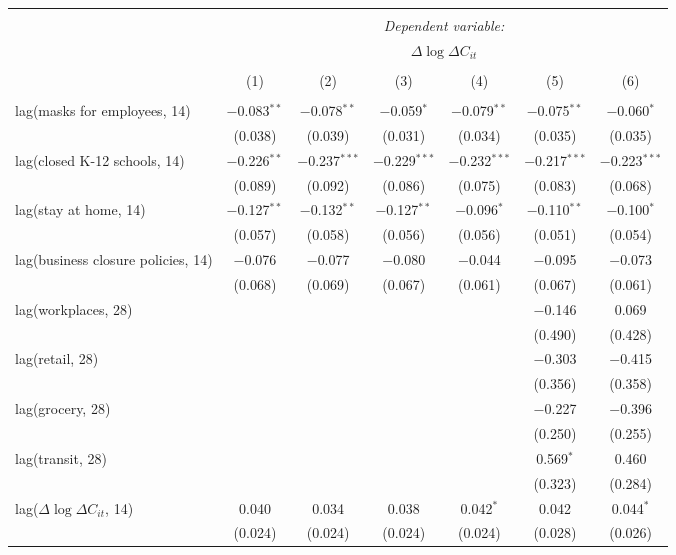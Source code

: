 \begin{tabular}{@{\extracolsep{1pt}}lcccccc} 
\\[-1.8ex]\hline 
\hline \\[-1.8ex] 
 & \multicolumn{6}{c}{\textit{Dependent variable:}} \\ 
\cline{2-7} 
 & \multicolumn{6}{c}{$\Delta \log \Delta C_{it}$} \\ 
\\[-1.8ex] & (1) & (2) & (3) & (4) & (5) & (6)\\ 
\hline \\[-1.8ex] 
 lag(masks for employees, 14) & $-$0.083$^{**}$ & $-$0.078$^{**}$ & $-$0.059$^{*}$ & $-$0.079$^{**}$ & $-$0.075$^{**}$ & $-$0.060$^{*}$ \\ 
  & (0.038) & (0.039) & (0.031) & (0.034) & (0.035) & (0.035) \\ 
  lag(closed K-12 schools, 14) & $-$0.226$^{**}$ & $-$0.237$^{***}$ & $-$0.229$^{***}$ & $-$0.232$^{***}$ & $-$0.217$^{***}$ & $-$0.223$^{***}$ \\ 
  & (0.089) & (0.092) & (0.086) & (0.075) & (0.083) & (0.068) \\ 
  lag(stay at home, 14) & $-$0.127$^{**}$ & $-$0.132$^{**}$ & $-$0.127$^{**}$ & $-$0.096$^{*}$ & $-$0.110$^{**}$ & $-$0.100$^{*}$ \\ 
  & (0.057) & (0.058) & (0.056) & (0.056) & (0.051) & (0.054) \\ 
  lag(business closure policies, 14) & $-$0.076 & $-$0.077 & $-$0.080 & $-$0.044 & $-$0.095 & $-$0.073 \\ 
  & (0.068) & (0.069) & (0.067) & (0.061) & (0.067) & (0.061) \\ 
  lag(workplaces, 28) &  &  &  &  & $-$0.146 & 0.069 \\ 
  &  &  &  &  & (0.490) & (0.428) \\ 
  lag(retail, 28) &  &  &  &  & $-$0.303 & $-$0.415 \\ 
  &  &  &  &  & (0.356) & (0.358) \\ 
  lag(grocery, 28) &  &  &  &  & $-$0.227 & $-$0.396 \\ 
  &  &  &  &  & (0.250) & (0.255) \\ 
  lag(transit, 28) &  &  &  &  & 0.569$^{*}$ & 0.460 \\ 
  &  &  &  &  & (0.323) & (0.284) \\ 
  lag($\Delta \log \Delta C_{it}$, 14) & 0.040 & 0.034 & 0.038 & 0.042$^{*}$ & 0.042 & 0.044$^{*}$ \\ 
  & (0.024) & (0.024) & (0.024) & (0.024) & (0.028) & (0.026) \\ 

\end{tabular}
